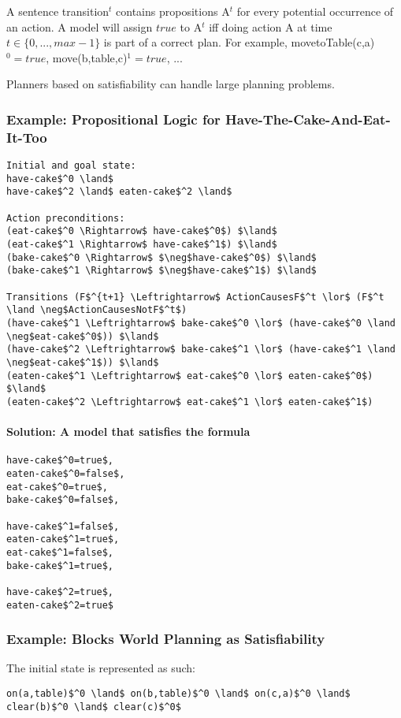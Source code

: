 A sentence transition$^t$ contains propositions A$^t$ for every potential
occurrence of an action. A model will assign $true$ to A$^t$ iff doing action A
at time $t \in \{0,...,max-1\}$ is part of a correct plan. For example,
movetoTable(c,a)$^0=true$, move(b,table,c)$^1=true$, ...

Planners based on satisfiability can handle large planning problems.

\subsubsection{Example: Propositional Logic for Have-The-Cake-And-Eat-It-Too}
\begin{lstlisting}
Initial and goal state:
have-cake$^0 \land$
have-cake$^2 \land$ eaten-cake$^2 \land$

Action preconditions:
(eat-cake$^0 \Rightarrow$ have-cake$^0$) $\land$
(eat-cake$^1 \Rightarrow$ have-cake$^1$) $\land$
(bake-cake$^0 \Rightarrow$ $\neg$have-cake$^0$) $\land$
(bake-cake$^1 \Rightarrow$ $\neg$have-cake$^1$) $\land$

Transitions (F$^{t+1} \Leftrightarrow$ ActionCausesF$^t \lor$ (F$^t \land \neg$ActionCausesNotF$^t$)
(have-cake$^1 \Leftrightarrow$ bake-cake$^0 \lor$ (have-cake$^0 \land \neg$eat-cake$^0$)) $\land$
(have-cake$^2 \Leftrightarrow$ bake-cake$^1 \lor$ (have-cake$^1 \land \neg$eat-cake$^1$)) $\land$
(eaten-cake$^1 \Leftrightarrow$ eat-cake$^0 \lor$ eaten-cake$^0$) $\land$
(eaten-cake$^2 \Leftrightarrow$ eat-cake$^1 \lor$ eaten-cake$^1$)
\end{lstlisting}

\paragraph{Solution: A model that satisfies the formula}
\begin{lstlisting}
have-cake$^0=true$,
eaten-cake$^0=false$,
eat-cake$^0=true$,
bake-cake$^0=false$,

have-cake$^1=false$,
eaten-cake$^1=true$,
eat-cake$^1=false$,
bake-cake$^1=true$,

have-cake$^2=true$,
eaten-cake$^2=true$
\end{lstlisting}

\subsubsection{Example: Blocks World Planning as Satisfiability}
The initial state is represented as such:
\begin{lstlisting}
on(a,table)$^0 \land$ on(b,table)$^0 \land$ on(c,a)$^0 \land$ clear(b)$^0 \land$ clear(c)$^0$
\end{lstlisting}

